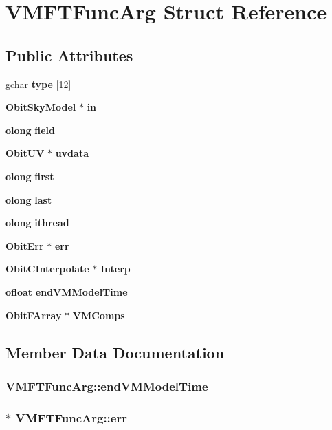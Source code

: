 \section{VMFTFunc\-Arg Struct Reference}
\label{structVMFTFuncArg}
\subsection*{Public Attributes}
\begin{CompactItemize}
\item 
gchar {\bf type} [12]
\item 
{\bf Obit\-Sky\-Model} $\ast$ {\bf in}
\item 
{\bf olong} {\bf field}
\item 
{\bf Obit\-UV} $\ast$ {\bf uvdata}
\item 
{\bf olong} {\bf first}
\item 
{\bf olong} {\bf last}
\item 
{\bf olong} {\bf ithread}
\item 
{\bf Obit\-Err} $\ast$ {\bf err}
\item 
{\bf Obit\-CInterpolate} $\ast$ {\bf Interp}
\item 
{\bf ofloat} {\bf end\-VMModel\-Time}
\item 
{\bf Obit\-FArray} $\ast$ {\bf VMComps}
\end{CompactItemize}


\subsection{Member Data Documentation}
\subsubsection{ {\bf VMFTFunc\-Arg::end\-VMModel\-Time}}\label{structVMFTFuncArg_o9}


\subsubsection{$\ast$ {\bf VMFTFunc\-Arg::err}}\label{structVMFTFuncArg_o7}


